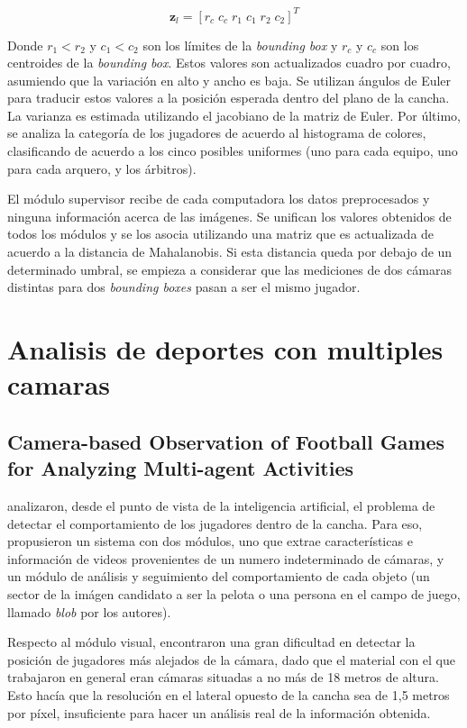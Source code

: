 \documentclass[a4paper,10pt]{article}
\begin{document}
\[
\mathbf{z}_l = [r_c \;  c_c  \; r_1  \; c_1  \; r_2  \; c_2]^T
\]

Donde $r_1 < r_2$ y $c_1 < c_2$ son los límites de la \textit{bounding box} y $r_c$ y $c_c$ son los
centroides de la \textit{bounding box}. Estos valores son actualizados cuadro por cuadro,
asumiendo que la variación en alto y ancho es baja. Se utilizan ángulos de Euler para
traducir estos valores a la posición esperada dentro del plano de la cancha. La varianza es estimada
utilizando el jacobiano de la matriz de Euler. Por último, se analiza la categoría de los
jugadores de acuerdo al histograma de colores, clasificando de acuerdo a los cinco posibles uniformes
(uno para cada equipo, uno para cada arquero, y los árbitros).

El módulo supervisor recibe de cada computadora los datos preprocesados y ninguna información
acerca de las imágenes. Se unifican los valores obtenidos de todos los módulos y se los asocia
utilizando una matriz que es actualizada de acuerdo a la distancia de Mahalanobis. Si esta
distancia queda por debajo de un determinado umbral, se empieza a considerar que las mediciones
de dos cámaras distintas para dos \textit{bounding boxes} pasan a ser el mismo jugador.

\section{Analisis de deportes con multiples camaras}
\label{sec:var-camaras}

\subsection{Camera-based Observation of Football Games for Analyzing Multi-agent Activities}

\citeauthor*{beetz-05, beetz-06} analizaron, desde el punto de vista de la inteligencia artificial,
el problema de detectar el comportamiento de los jugadores dentro de la cancha. Para eso, propusieron
un sistema con dos módulos, uno que extrae características e información de videos provenientes de
un numero indeterminado de cámaras, y un módulo de análisis y seguimiento del comportamiento de cada
objeto (un sector de la imágen candidato a ser la pelota o una persona en el campo de juego, 
llamado \textit{blob} por los autores).

Respecto al módulo visual, encontraron una gran dificultad en detectar la posición de jugadores más alejados
de la cámara, dado que el material con el que trabajaron en general eran cámaras situadas a no más de
18 metros de altura. Esto hacía que la resolución en el lateral opuesto de la cancha sea de 1,5 metros por píxel,
insuficiente para hacer un análisis real de la información obtenida.
\end{document}
